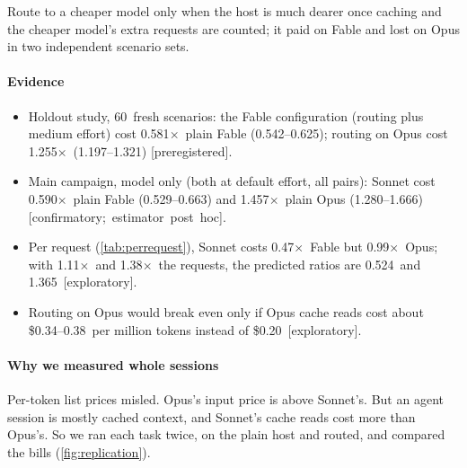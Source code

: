 \documentclass[11pt,letterpaper]{article}
\newcommand{\prereg}{\mbox{\textsf{\small\color{okblue}[preregistered]}}}
\newcommand{\confpost}{\mbox{\textsf{\small\color{okblue}[confirmatory; estimator post hoc]}}}
\newcommand{\expl}{\mbox{\textsf{\small\color{okgray}[exploratory]}}}
\newcommand{\X}{\ensuremath{\times}}
\newcommand{\BEStickyArm}{0.34}
\newcommand{\BEStickyPair}{0.38}
\newcommand{\CfFableSonnetArm}{0.590}
\newcommand{\CfFableSonnetArmCIThree}{0.529--0.663}
\newcommand{\CfOpusSonnetArm}{1.457}
\newcommand{\CfOpusSonnetArmCIThree}{1.280--1.666}
\newcommand{\PriceOpusRead}{0.20}
\newcommand{\RpMultFable}{1.11}
\newcommand{\RpMultOpus}{1.38}
\newcommand{\RqPredFable}{0.524}
\newcommand{\RqPredOpus}{1.365}
\newcommand{\RqSonnetOverFable}{0.47}
\newcommand{\RqSonnetOverOpus}{0.99}
\newcommand{\SHFiveCI}{1.197--1.321}
\newcommand{\SHFiveRatio}{1.255}
\newcommand{\SHOneCI}{0.542--0.625}
\newcommand{\SHOneRatio}{0.581}
\newcommand{\SOnePanelN}{60}
\begin{document}
\begin{claimbox}
Route to a cheaper model only when the host is much dearer once caching and the cheaper model's extra requests are counted; it paid on Fable and lost on Opus in two independent scenario sets.
\end{claimbox}

\paragraph{Evidence}
\begin{itemize}[leftmargin=1.2em]
  \item Holdout study, \SOnePanelN\ fresh scenarios: the Fable configuration (routing plus medium effort) cost
    \SHOneRatio\X\ plain Fable (\SHOneCI); routing on Opus cost \SHFiveRatio\X\ (\SHFiveCI) \prereg.
  \item Main campaign, model only (both at default effort, all pairs): Sonnet cost \CfFableSonnetArm\X\ plain Fable
    (\CfFableSonnetArmCIThree) and \CfOpusSonnetArm\X\ plain Opus (\CfOpusSonnetArmCIThree) \confpost.
  \item Per request (\cref{tab:perrequest}), Sonnet costs \RqSonnetOverFable\X\ Fable but \RqSonnetOverOpus\X\ Opus; with
    \RpMultFable\X\ and \RpMultOpus\X\ the requests, the predicted ratios are \RqPredFable\ and \RqPredOpus\ \expl.
  \item Routing on Opus would break even only if Opus cache reads cost about \$\BEStickyArm--\BEStickyPair\ per million tokens instead
    of \$\PriceOpusRead\ \expl.
\end{itemize}

\paragraph{Why we measured whole sessions} Per-token list prices misled. Opus's input price is above Sonnet's. But an
agent session is mostly cached context, and Sonnet's cache reads cost more than Opus's. So we ran each task twice, on
the plain host and routed, and compared the bills (\cref{fig:replication}).
\end{document}
